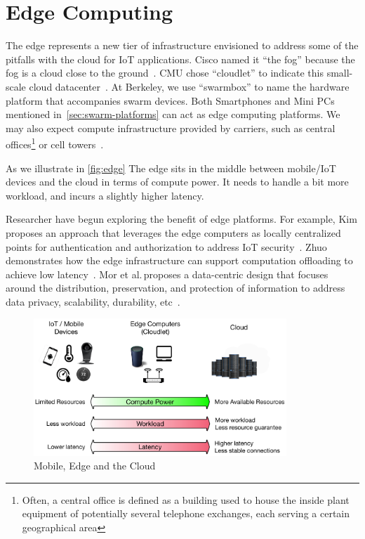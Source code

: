 \section{Edge Computing}
\label{sec:edge-computing}

The edge represents a new tier of infrastructure envisioned to address some of
the pitfalls with the cloud for IoT applications. Cisco named it ``the fog''
because the fog is a cloud close to the ground~\cite{bonomi2012fog}. CMU chose
``cloudlet'' to indicate this small-scale cloud datacenter~\cite{ha2014towards,
  satyanarayanan2009case}. At Berkeley, we use ``swarmbox'' to name the hardware
platform that accompanies swarm devices. Both Smartphones and Mini PCs mentioned
in~\autoref{sec:swarm-platforms} can act as edge computing platforms. We may
also expect compute infrastructure provided by carriers, such as central
offices\footnote{Often, a central office is defined as a building used to house
  the inside plant equipment of potentially several telephone exchanges, each
  serving a certain geographical area} or cell towers~\cite{att2017edge}.

As we illustrate in \autoref{fig:edge} The edge sits in the middle between
mobile/IoT devices and the cloud in terms of compute power. It needs to handle a
bit more workload, and incurs a slightly higher latency.

Researcher have begun exploring the benefit of edge platforms. For example, Kim
proposes an approach that leverages the edge computers as locally centralized
points for authentication and authorization to address IoT
security~\cite{kim2017securing}. Zhuo demonstrates how the edge infrastructure
can support computation offloading to achieve low
latency~\cite{chen2018application}. Mor et al.\,proposes a data-centric design
that focuses around the distribution, preservation, and protection of
information to address data privacy, scalability, durability,
etc~\cite{mor2016toward}.

\begin{figure}
  \centering
  \includegraphics[width=0.85\textwidth]{figures/background.pdf}
  \caption{Mobile, Edge and the Cloud}
  \label{fig:edge}
\end{figure}

